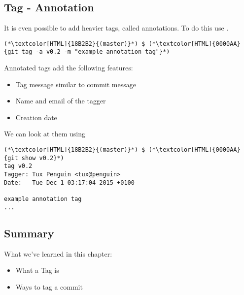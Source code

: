 \subsection{Tag - Annotation}
\begin{frame}[fragile]
  \subslidetitle
  It is even possible to add heavier tags, called annotations. To do this use .

  \begin{lstlisting}
(*\textcolor[HTML]{18B2B2}{(master)}*) $ (*\textcolor[HTML]{0000AA}{git tag -a v0.2 -m "example annotation tag"}*)
\end{lstlisting}

  Annotated tags add the following features:
  \begin{itemize}
    \item Tag message similar to commit message
    \item Name and email of the tagger
    \item Creation date
  \end{itemize}

  We can look at them using 
  \begin{lstlisting}
(*\textcolor[HTML]{18B2B2}{(master)}*) $ (*\textcolor[HTML]{0000AA}{git show v0.2}*)
tag v0.2
Tagger: Tux Penguin <tux@penguin>
Date:   Tue Dec 1 03:17:04 2015 +0100

example annotation tag
...
\end{lstlisting}

\end{frame}


\subsection{Summary}
\begin{frame}[fragile]
\subslidetitle
  What we've learned in this chapter:
  \begin{itemize}
    \item What a Tag is
    \item Ways to tag a commit
  \end{itemize}
\end{frame}
